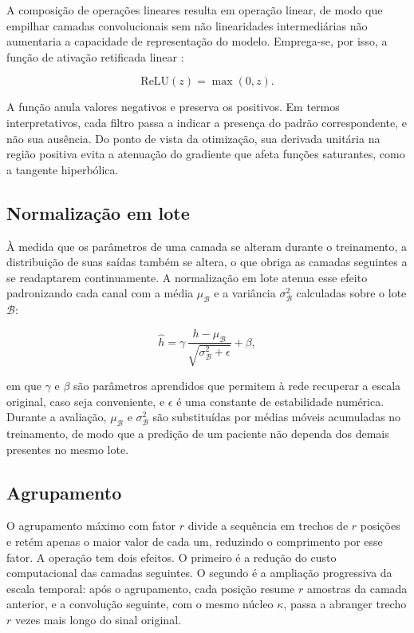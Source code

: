 A composição de operações lineares resulta em operação linear, de modo que
empilhar camadas convolucionais sem não linearidades intermediárias não
aumentaria a capacidade de representação do modelo. Emprega-se, por isso, a
função de ativação retificada linear \cite{nair2010rectified}:

\begin{equation}
	\mathrm{ReLU}(z) = \max(0, z).
	\label{eq:relu}
\end{equation}

A função anula valores negativos e preserva os positivos. Em termos
interpretativos, cada filtro passa a indicar a presença do padrão
correspondente, e não sua ausência. Do ponto de vista da otimização, sua
derivada unitária na região positiva evita a atenuação do gradiente que
afeta funções saturantes, como a tangente hiperbólica.

\subsection{Normalização em lote}
\label{subsec:fund-batchnorm}

À medida que os parâmetros de uma camada se alteram durante o treinamento, a
distribuição de suas saídas também se altera, o que obriga as camadas
seguintes a se readaptarem continuamente. A normalização em lote
\cite{ioffe2015batch} atenua esse efeito padronizando cada canal com a
média $\mu_{\mathcal{B}}$ e a variância $\sigma^{2}_{\mathcal{B}}$
calculadas sobre o lote $\mathcal{B}$:

\begin{equation}
	\hat{h} = \gamma \, \frac{h - \mu_{\mathcal{B}}}
	{\sqrt{\sigma^{2}_{\mathcal{B}} + \epsilon}} + \beta,
	\label{eq:batchnorm}
\end{equation}

\noindent
em que $\gamma$ e $\beta$ são parâmetros aprendidos que permitem à rede
recuperar a escala original, caso seja conveniente, e $\epsilon$ é uma
constante de estabilidade numérica. Durante a avaliação, $\mu_{\mathcal{B}}$
e $\sigma^{2}_{\mathcal{B}}$ são substituídas por médias móveis acumuladas no
treinamento, de modo que a predição de um paciente não dependa dos demais
presentes no mesmo lote.

\subsection{Agrupamento}
\label{subsec:fund-pooling}

O agrupamento máximo com fator $r$ divide a sequência em trechos de $r$
posições e retém apenas o maior valor de cada um, reduzindo o comprimento por
esse fator. A operação tem dois efeitos. O primeiro é a redução do custo
computacional das camadas seguintes. O segundo é a ampliação progressiva da
escala temporal: após o agrupamento, cada posição resume $r$ amostras da
camada anterior, e a convolução seguinte, com o mesmo núcleo $\kappa$, passa
a abranger trecho $r$ vezes mais longo do sinal original.

